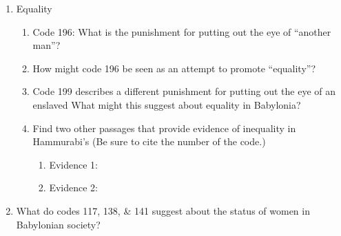 \documentclass[12pt]{article}
\begin{document}
\begin{enumerate}
\item{Equality}
    \begin{enumerate}[1.]
        \item{Code 196: What is the punishment for putting out the eye of “another
            man”?}

        \item{How might code 196 be seen as an attempt to promote “equality”?}

        \item{Code 199 describes a different punishment for putting out the eye of
            an enslaved What might this suggest about equality in Babylonia?}

        \item{Find two other passages that provide evidence of inequality in
        Hammurabi’s (Be sure to cite the number of the code.)}
        \begin{enumerate}[1.]
            \item{Evidence 1:}
            \item{Evidence 2:}
        \end{enumerate}
    \end{enumerate}
 
\item{What do codes 117, 138, & 141 suggest about the status of women in
Babylonian society?}



\end{enumerate}
\end{document}
